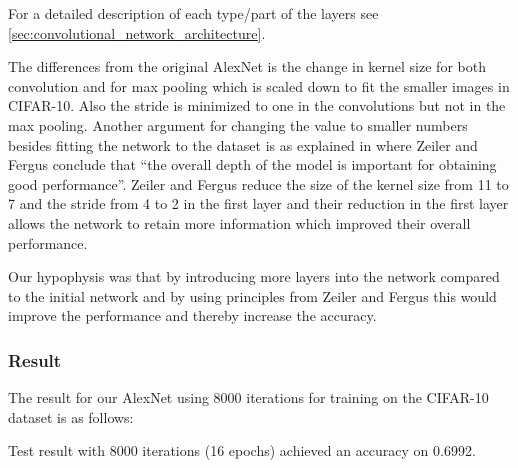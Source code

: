 For a detailed description of each type/part of the layers see
\autoref{sec:convolutional_network_architecture}. 


The differences from the original AlexNet is the change in kernel size for both
convolution and for max pooling which is scaled down to fit the smaller
images in CIFAR-10. Also the stride is minimized to one in the convolutions but
not in the max pooling. Another argument for changing the value to smaller
numbers besides fitting the network to the dataset is as explained in
\cite{ZeilerFergus} where Zeiler and Fergus conclude that ``the overall depth of
the model is important for obtaining good performance''. Zeiler and
Fergus\cite{ZeilerFergus} reduce the size of the kernel size from 11 to 7 and
the stride from 4 to 2 in the first layer and their reduction in the first layer
allows the network to retain more information which improved their overall
performance. 


Our hypophysis was that by introducing more layers into the network compared to
the initial network and by using principles from Zeiler and
Fergus\cite{ZeilerFergus} this would improve the performance
and thereby increase the accuracy.


\subsubsection{Result}

The result for our AlexNet using 8000 iterations for training on the CIFAR-10
dataset is as follows: 

Test result with 8000 iterations (16 epochs) achieved an accuracy on 0.6992. 


